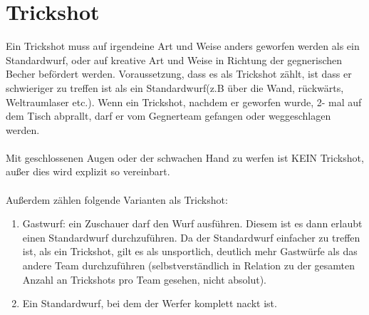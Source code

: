 \documentclass[a5paper, 12pt]{book}
\begin{document}
\section{Trickshot}\label{trickshot}
Ein Trickshot muss auf irgendeine Art und Weise anders geworfen werden als ein Standardwurf, oder auf kreative Art und Weise in Richtung der gegnerischen Becher befördert werden. Voraussetzung, dass es als Trickshot zählt, ist dass er schwieriger zu treffen ist als ein Standardwurf(z.B über die Wand, rückwärts, Weltraumlaser etc.). Wenn ein Trickshot, nachdem er geworfen wurde, 2- mal auf dem Tisch abprallt, darf er vom Gegnerteam gefangen oder weggeschlagen werden.\\\\
Mit geschlossenen Augen oder der schwachen Hand zu werfen ist KEIN Trickshot, außer dies wird explizit so vereinbart.\\\\
Außerdem zählen folgende Varianten als Trickshot:
\begin{enumerate}[(1)]
    \item Gastwurf: ein Zuschauer darf den Wurf ausführen. Diesem ist es dann erlaubt einen Standardwurf durchzuführen. Da der Standardwurf einfacher zu treffen ist, als ein Trickshot, gilt es als unsportlich, deutlich mehr Gastwürfe als das andere Team durchzuführen (selbstverständlich in Relation zu der gesamten Anzahl an Trickshots pro Team gesehen, nicht absolut).
    \item Ein Standardwurf, bei dem der Werfer komplett nackt ist.
\end{enumerate}
\end{document}
